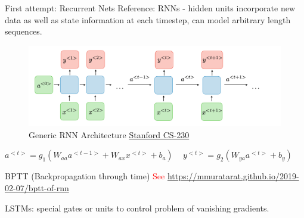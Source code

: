 \documentclass{beamer}
\begin{document}
\begin{frame}{First attempt: Recurrent Nets}
    Reference: \cite{Nan2016}
    RNNs - hidden units incorporate new data as well as state information at each timestep, can model arbitrary length sequences.

    \begin{figure}
        \centering
        \includegraphics[width=0.7\linewidth]{slides_20231201//figures/rnn_arch_sfcs.png}
        \caption{Generic RNN Architecture \href{https://stanford.edu/~shervine/teaching/cs-230/cheatsheet-recurrent-neural-networks}{Stanford CS-230}}
        \label{fig:rnn_arch}
    \end{figure}

    $a^{<t>}=g_1(W_{aa}a^{<t-1>}+W_{ax}x^{<t>}+b_a)\, \quad y^{<t>}=g_2(W_{ya}a^{<t>}+b_y)$

    BPTT (Backpropagation through time) \textcolor{red}{See \url{https://mmuratarat.github.io/2019-02-07/bptt-of-rnn}}
    
    LSTMs: special gates or units to control problem of vanishing gradients. \cite{hochreiter_2009}
\end{frame}
\end{document}
